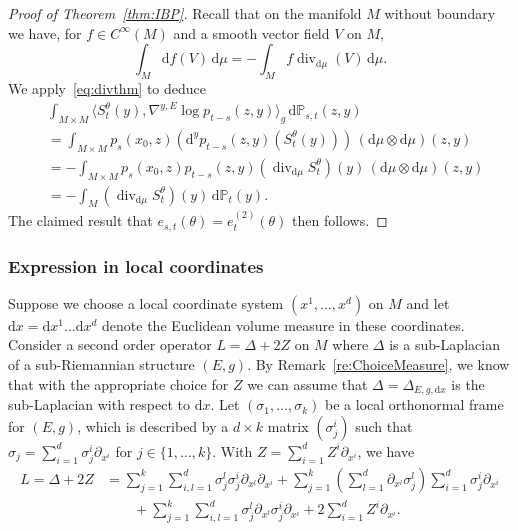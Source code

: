 \documentclass[10pt]{amsart}
\theoremstyle{remark}
\newcommand{\pp}{\mathbb{P}}
\DeclareMathOperator{\dv}{div}
\newcommand{\dd}{\,{\mathrm d}}
\newcommand{\db}{{\mathrm d}}
\numberwithin{equation}{section}
\begin{document}
\begin{proof}[Proof of Theorem~\ref{thm:IBP}]
Recall that on the manifold $M$ without boundary we have, for $f\in C^\infty(M)$ and a smooth vector field $V$ on $M$,
\begin{equation}\label{eq:divthm}
    \int_M \db f(V) \dd\mu = -\int_M f \dv_{\db\mu}(V) \dd\mu.
\end{equation}
We apply~\eqref{eq:divthm} to deduce
\begin{align*}
& \int_{M \times M} \langle S_t^\theta(y), \nabla^{y,E} \log p_{t-s}(z,y) \rangle_g \dd\pp_{s,t}(z,y) \\
& = \int_{M \times M} p_s(x_0, z) (\db^y p_{t-s}(z,y)(S_t^\theta(y))) \, (\db\mu \otimes \db\mu)(z,y) \\
& = - \int_{M \times M} p_s(x_0,z) p_{t-s}(z,y)(\dv_{\db\mu} S_t^\theta)(y) \, (\db\mu \otimes \db\mu)(z,y)  \\
& = - \int_{M} (\dv_{\db\mu} S_t^\theta)(y) \dd\pp_t(y).
\end{align*}
The claimed result that $e_{s,t}(\theta) = e^{(2)}_t(\theta)$ then follows.
\end{proof}

\subsubsection{Expression in local coordinates} \label{sec:localSDE}
Suppose we choose a local coordinate system $(x^1, \dots, x^d)$ on $M$ and let $\db x = \db x^1 \dots \db x^d$ denote the Euclidean volume measure in these coordinates. Consider a second order operator $L = \Delta + 2Z$ on $M$ where $\Delta$ is a sub-Laplacian of a sub-Riemannian structure $(E,g)$. By Remark~\ref{re:ChoiceMeasure}, we know that with the appropriate choice for $Z$ we can  assume that $\Delta = \Delta_{E,g,\db x}$ is the sub-Laplacian with respect to $\db x$. Let $(\sigma_1, \dots, \sigma_k)$ be a local orthonormal frame for $(E,g)$, which is described by a $d \times k$ matrix $(\sigma_j^i)$ such that $\sigma_j = \sum_{i=1}^d \sigma_j^i \partial_{x^i}$ for $j\in\{1,\dots,k\}$. With $Z = \sum_{i=1}^d Z^i \partial_{x^i}$, we have
\begin{align*} L = \Delta +2Z &= \sum_{j=1}^k \sum_{i,l=1}^d \sigma_j^l \sigma^i_j \partial_{x^l}  \partial_{x^i} + \sum_{j=1}^k \left( \sum_{l=1}^d \partial_{x^l} \sigma_j^l \right) \sum_{i=1}^d \sigma_j^i \partial_{x^i} \\
& \qquad + \sum_{j=1}^k \sum_{i,l=1}^d \sigma^l_j   \partial_{x^l} \sigma_j^i \partial_{x^i}  + 2\sum_{i=1}^d Z^i \partial_{x^i}. \end{align*}
\end{document}
